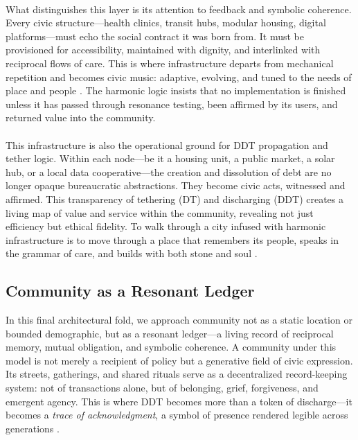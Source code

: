 \documentclass[12pt]{article}
\begin{document}
\paragraph{}What distinguishes this layer is its attention to feedback and symbolic coherence. Every civic structure—health clinics, transit hubs, modular housing, digital platforms—must echo the social contract it was born from. It must be provisioned for accessibility, maintained with dignity, and interlinked with reciprocal flows of care. This is where infrastructure departs from mechanical repetition and becomes civic music: adaptive, evolving, and tuned to the needs of place and people \cite{spade2015normal,cohen2009principled}. The harmonic logic insists that no implementation is finished unless it has passed through resonance testing, been affirmed by its users, and returned value into the community.

\paragraph{}This infrastructure is also the operational ground for DDT propagation and tether logic. Within each node—be it a housing unit, a public market, a solar hub, or a local data cooperative—the creation and dissolution of debt are no longer opaque bureaucratic abstractions. They become civic acts, witnessed and affirmed. This transparency of tethering (DT) and discharging (DDT) creates a living map of value and service within the community, revealing not just efficiency but ethical fidelity. To walk through a city infused with harmonic infrastructure is to move through a place that remembers its people, speaks in the grammar of care, and builds with both stone and soul \cite{standing2017basicincome}.

\subsection{Community as a Resonant Ledger}

In this final architectural fold, we approach community not as a static location or bounded demographic, but as a resonant ledger—a living record of reciprocal memory, mutual obligation, and symbolic coherence. A community under this model is not merely a recipient of policy but a generative field of civic expression. Its streets, gatherings, and shared rituals serve as a decentralized record-keeping system: not of transactions alone, but of belonging, grief, forgiveness, and emergent agency. This is where DDT becomes more than a token of discharge—it becomes a \textit{trace of acknowledgment}, a symbol of presence rendered legible across generations \cite{ahmed2004cultural,rose1992inalienable}.
\end{document}

